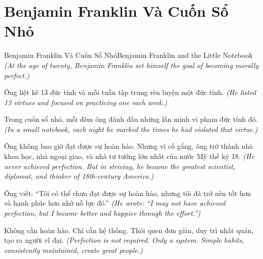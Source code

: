 \section{Benjamin Franklin Và Cuốn Sổ Nhỏ}
\begin{truyen}{Benjamin Franklin Và Cuốn Sổ Nhỏ}{Benjamin Franklin and the Little Notebook}
\textit{(At the age of twenty, Benjamin Franklin set himself the goal of becoming morally perfect.)}

Ông liệt kê 13 đức tính và mỗi tuần tập trung rèn luyện một đức tính.
\textit{(He listed 13 virtues and focused on practicing one each week.)}

Trong cuốn sổ nhỏ, mỗi đêm ông đánh dấu những lần mình vi phạm đức tính đó.
\textit{(In a small notebook, each night he marked the times he had violated that virtue.)}

Ông không bao giờ đạt được sự hoàn hảo. Nhưng vì cố gắng, ông trở thành nhà khoa học, nhà ngoại giao, và nhà tư tưởng lớn nhất của nước Mỹ thế kỷ 18.
\textit{(He never achieved perfection. But in striving, he became the greatest scientist, diplomat, and thinker of 18th-century America.)}

Ông viết: ``Tôi có thể chưa đạt được sự hoàn hảo, nhưng tôi đã trở nên tốt hơn và hạnh phúc hơn nhờ nỗ lực đó.''
\textit{(He wrote: ``I may not have achieved perfection, but I became better and happier through the effort.'')}

\end{truyen}

\begin{baihoc}
Không cần hoàn hảo. Chỉ cần hệ thống. Thói quen đơn giản, duy trì nhất quán, tạo ra người vĩ đại.
\textit{(Perfection is not required. Only a system. Simple habits, consistently maintained, create great people.)}
\end{baihoc}
\ngancach

